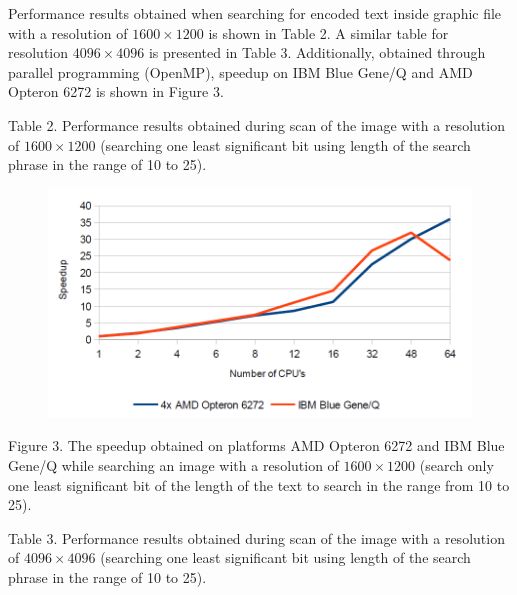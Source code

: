 \documentclass[10pt, a5paper]{article}
\begin{document}
Performance results obtained when searching for encoded text inside graphic file with a resolution of $1600\times1200$ is shown in Table 2. A similar table for resolution $4096\times4096$ is presented in Table 3. Additionally, obtained through parallel programming (OpenMP), speedup on IBM Blue Gene/Q and AMD Opteron 6272 is shown in Figure 3.


Table 2. Performance results obtained during scan of the image with a resolution of $1600\times1200$ (searching one least significant bit using length of the search phrase in the range of 10 to 25).

\begin{center}
\begin{figure}[h!]
  \centering
  \includegraphics[width=\textwidth]{103_2014_w_Kwiatkowska_speedup.png}
\end{figure}
Figure 3. The speedup obtained on platforms AMD Opteron 6272 and IBM Blue Gene/Q while searching an image with a resolution of $1600\times1200$ (search only one least significant bit of the length of the text to search in the range from 10 to 25).
\end{center}

Table 3. Performance results obtained during scan of the image with a resolution of $4096\times4096$ (searching one least significant bit using length of the search phrase in the range of 10 to 25).
\end{document}
